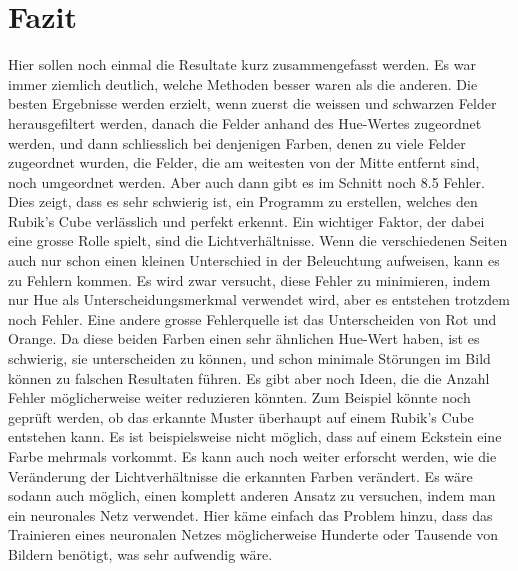 \documentclass[a4paper, 12pt]{article}
\begin{document}
\section{Fazit}
Hier sollen noch einmal die Resultate kurz zusammengefasst werden. Es war immer ziemlich deutlich, welche Methoden besser waren als die anderen. Die besten Ergebnisse werden erzielt, wenn zuerst die weissen und schwarzen Felder herausgefiltert werden, danach die Felder anhand des Hue-Wertes zugeordnet werden, und dann schliesslich bei denjenigen Farben, denen zu viele Felder zugeordnet wurden, die Felder, die am weitesten von der Mitte entfernt sind, noch umgeordnet werden.
\newline
Aber auch dann gibt es im Schnitt noch 8.5 Fehler. Dies zeigt, dass es sehr schwierig ist, ein Programm zu erstellen, welches den Rubik's Cube verlässlich und perfekt erkennt. Ein wichtiger Faktor, der dabei eine grosse Rolle spielt, sind die Lichtverhältnisse. Wenn die verschiedenen Seiten auch nur schon einen kleinen Unterschied in der Beleuchtung aufweisen, kann es zu Fehlern kommen. Es wird zwar versucht, diese Fehler zu minimieren, indem nur Hue als Unterscheidungsmerkmal verwendet wird, aber es entstehen trotzdem noch Fehler. Eine andere grosse Fehlerquelle ist das Unterscheiden von Rot und Orange. Da diese beiden Farben einen sehr ähnlichen Hue-Wert haben, ist es schwierig, sie unterscheiden zu können, und schon minimale Störungen im Bild können zu falschen Resultaten führen.
\newline
Es gibt aber noch Ideen, die die Anzahl Fehler möglicherweise weiter reduzieren könnten. Zum Beispiel könnte noch geprüft werden, ob das erkannte Muster überhaupt auf einem Rubik's Cube entstehen kann. Es ist beispielsweise nicht möglich, dass auf einem Eckstein eine Farbe mehrmals vorkommt. Es kann auch noch weiter erforscht werden, wie die Veränderung der Lichtverhältnisse die erkannten Farben verändert. Es wäre sodann auch möglich, einen komplett anderen Ansatz zu versuchen, indem man ein neuronales Netz verwendet. Hier käme einfach das Problem hinzu, dass das Trainieren eines neuronalen Netzes möglicherweise Hunderte oder Tausende von Bildern benötigt, was sehr aufwendig wäre.
\newpage
\printbibliography[heading=bibnumbered]
\end{document}
